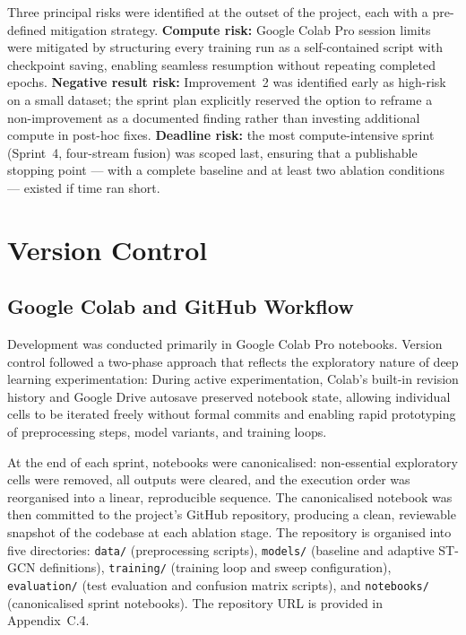 Three principal risks were identified at the outset of the project, each with a pre-defined mitigation strategy. \textbf{Compute risk:} Google Colab Pro session limits were mitigated by structuring every training run as a self-contained script with checkpoint saving, enabling seamless resumption without repeating completed epochs. \textbf{Negative result risk:} Improvement~2 was identified early as high-risk on a small dataset; the sprint plan explicitly reserved the option to reframe a non-improvement as a documented finding rather than investing additional compute in post-hoc fixes. \textbf{Deadline risk:} the most compute-intensive sprint (Sprint~4, four-stream fusion) was scoped last, ensuring that a publishable stopping point --- with a complete baseline and at least two ablation conditions --- existed if time ran short.

\section{Version Control}
\label{sec:version-control}

\subsection{Google Colab and GitHub Workflow}
\label{sec:workflow}

Development was conducted primarily in Google Colab Pro notebooks. Version control followed a two-phase approach that reflects the exploratory nature of deep learning experimentation:
During active experimentation, Colab's built-in revision history and Google Drive autosave preserved notebook state, allowing individual cells to be iterated freely without formal commits and enabling rapid prototyping of preprocessing steps, model variants, and training loops.

At the end of each sprint, notebooks were canonicalised: non-essential exploratory cells were removed, all outputs were cleared, and the execution order was reorganised into a linear, reproducible sequence. The canonicalised notebook was then committed to the project's GitHub repository, producing a clean, reviewable snapshot of the codebase at each ablation stage. The repository is organised into five directories: \texttt{data/} (preprocessing scripts), \texttt{models/} (baseline and adaptive ST-GCN definitions), \texttt{training/} (training loop and sweep configuration), \texttt{evaluation/} (test evaluation and confusion matrix scripts), and \texttt{notebooks/} (canonicalised sprint notebooks). The repository URL is provided in Appendix~C.4.

